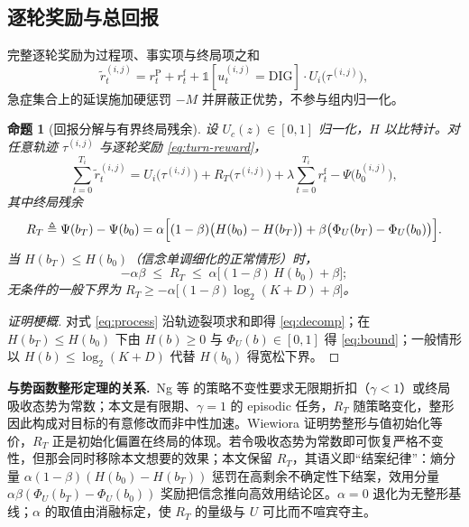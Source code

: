 \documentclass[11pt,a4paper]{ctexart}
\newtheorem{proposition}{命题}
\newcommand{\1}[1]{\mathbb{1}\!\left[#1\right]}
\begin{document}
\subsection{逐轮奖励与总回报}
完整逐轮奖励为过程项、事实项与终局项之和
\begin{equation}\label{eq:turn-reward}
\tilde r_t^{(i,j)}
=r_t^{\mathrm{P}}+r_t^{\mathrm{f}}
+\1{u_t^{(i,j)}=\mathrm{DIG}}\cdot U_i\bigl(\tau^{(i,j)}\bigr),
\end{equation}
急症集合上的延误施加硬惩罚 $-M$ 并屏蔽正优势，不参与组内归一化。

\begin{proposition}[回报分解与有界终局残余]\label{prop:decomp}
设 $U_c(z)\in[0,1]$ 归一化，$H$ 以比特计。对任意轨迹 $\tau^{(i,j)}$ 与逐轮奖励 \eqref{eq:turn-reward}，
\begin{equation}\label{eq:decomp}
\sum_{t=0}^{T_i}\tilde r_t^{(i,j)}
=U_i\bigl(\tau^{(i,j)}\bigr)+R_T\bigl(\tau^{(i,j)}\bigr)
+\lambda\sum_{t=0}^{T_i} r_t^{\mathrm{f}}-\Psi\bigl(b_0^{(i,j)}\bigr),
\end{equation}
其中终局残余
\begin{equation}\label{eq:residual}
R_T\triangleq\Psi(b_T)-\Psi(b_0)
=\alpha\Bigl[(1-\beta)\bigl(H(b_0)-H(b_T)\bigr)
+\beta\bigl(\Phi_U(b_T)-\Phi_U(b_0)\bigr)\Bigr].
\end{equation}
当 $H(b_T)\le H(b_0)$（信念单调细化的正常情形）时，
\begin{equation}\label{eq:bound}
-\alpha\beta\;\le\;R_T\;\le\;\alpha\bigl[(1-\beta)\,H(b_0)+\beta\bigr];
\end{equation}
无条件的一般下界为 $R_T\ge-\alpha\bigl[(1-\beta)\log_2(K+D)+\beta\bigr]$。
\end{proposition}

\begin{proof}[证明梗概]
对式 \eqref{eq:process} 沿轨迹裂项求和即得 \eqref{eq:decomp}；在 $H(b_T)\le H(b_0)$ 下由 $H(b)\ge0$ 与 $\Phi_U(b)\in[0,1]$ 得 \eqref{eq:bound}；一般情形以 $H(b)\le\log_2(K+D)$ 代替 $H(b_0)$ 得宽松下界。
\end{proof}

\textbf{与势函数整形定理的关系.}\
Ng 等 \cite{ng1999policy} 的策略不变性要求无限期折扣（$\gamma<1$）或终局吸收态势为常数；本文是有限期、$\gamma=1$ 的 episodic 任务，$R_T$ 随策略变化，整形因此构成对目标的有意修改而非中性加速。Wiewiora \cite{wiewiora2003potential} 证明势整形与值初始化等价，$R_T$ 正是初始化偏置在终局的体现。若令吸收态势为常数即可恢复严格不变性，但那会同时移除本文想要的效果；本文保留 $R_T$，其语义即``结案纪律''：熵分量 $\alpha(1-\beta)(H(b_0)-H(b_T))$ 惩罚在高剩余不确定性下结案，效用分量 $\alpha\beta(\Phi_U(b_T)-\Phi_U(b_0))$ 奖励把信念推向高效用结论区。$\alpha=0$ 退化为无整形基线；$\alpha$ 的取值由消融标定，使 $R_T$ 的量级与 $U$ 可比而不喧宾夺主。
\end{document}
